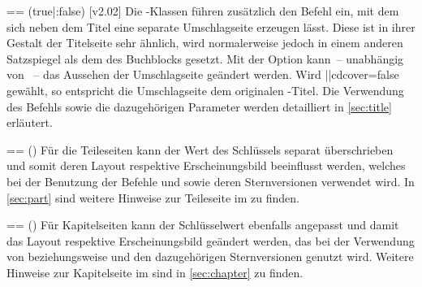 \begin{DeclareEntity*}{}
\begin{DeclareEntity*}{}
\begin{DeclareEntity*}{}
\begin{Declaration}
  {}=\cdalias=
  (true|:false)
  [v2.02]
Die \TUDScript-Klassen führen zusätzlich den Befehl  ein, mit 
dem sich neben dem Titel eine separate Umschlagseite erzeugen lässt. Diese ist 
in ihrer Gestalt der Titelseite sehr ähnlich, wird normalerweise jedoch in 
einem anderen Satzspiegel als dem des Buchblocks gesetzt. Mit der Option 
 kann~-- unabhängig von ~-- das Aussehen der 
Umschlagseite geändert werden. Wird \Option||{cdcover=false} gewählt, so 
entspricht die Umschlagseite dem originalen \KOMAScript-Titel. Die Verwendung 
des Befehls  sowie die dazugehörigen Parameter werden 
detailliert in \autoref{sec:title} erläutert.
\end{Declaration}

\begin{Declaration}
  {}=\cdalias=
  ()
Für die Teileseiten kann der Wert des Schlüssels  separat 
überschrieben und somit deren Layout respektive Erscheinungsbild beeinflusst 
werden, welches bei der Benutzung der Befehle  und 
sowie deren Sternversionen verwendet wird. In \autoref{sec:part} sind weitere 
Hinweise zur Teileseite im 
\CD zu finden.
\end{Declaration}

\begin{Declaration}
  {}=\cdalias=
  ()
Für Kapitelseiten kann der Schlüsselwert  ebenfalls angepasst 
und damit das Layout respektive Erscheinungsbild geändert werden, das bei der 
Verwendung von  beziehungsweise  und den 
dazugehörigen Sternversionen genutzt wird. Weitere Hinweise zur Kapitelseite im 
\CD sind in \autoref{sec:chapter} zu finden.
\end{Declaration}


\end{DeclareEntity*}
\end{DeclareEntity*}
\end{DeclareEntity*}
